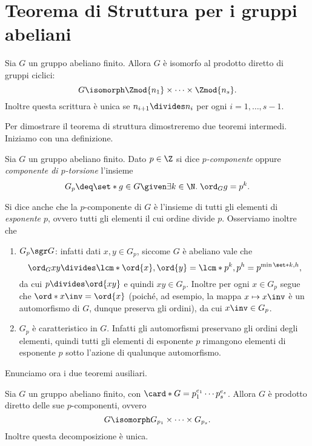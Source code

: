 \section{Teorema di Struttura per i gruppi abeliani}

\begin{theorem}
    \label{th:abelian_structure}
    Sia $G$ un gruppo abeliano finito. Allora $G$ è isomorfo al prodotto diretto di gruppi ciclici:
    \begin{equation}
        G \isomorph \Zmod{n_1} \times \cdots \times \Zmod{n_s}.
    \end{equation} Inoltre questa scrittura è unica se $n_{i+1} \divides n_i$ per ogni $i = 1, \dots, s-1$.
\end{theorem}

Per dimostrare il teorema di struttura dimostreremo due teoremi intermedi. Iniziamo con una definizione.

\begin{definition}
     Sia $G$ un gruppo abeliano finito. Dato $p \in \Z$ si dice \emph{$p$-componente} oppure \emph{componente di $p$-torsione} l'insieme \[
        G_p \deq \set*{g \in G \given \exists k \in \N.\; \ord_{G}{g} = p^k}.
    \]
\end{definition}

Si dice anche che la $p$-componente di $G$ è l'insieme di tutti gli elementi di \emph{esponente $p$}, ovvero tutti gli elementi il cui ordine divide $p$.
Osserviamo inoltre che \begin{enumerate}[label={(\arabic*)}]
    \item $G_p \sgr G$: infatti dati $x, y \in G_p$, siccome $G$ è abeliano vale che \[
        \ord_{G}{xy} \divides \lcm*{\ord{x}, \ord{y}} = \lcm*{p^k, p^h} = p^{\min\set*{k, h}},
    \] da cui $p \divides \ord{xy}$ e quindi $xy \in G_p$. Inoltre per ogni $x \in G_p$ segue che $\ord*{x\inv} = \ord{x}$ (poiché, ad esempio, la mappa $x \mapsto x\inv$ è un automorfismo di $G$, dunque preserva gli ordini), da cui $x\inv \in G_p$.
    \item $G_p$ è caratteristico in $G$. Infatti gli automorfismi preservano gli ordini degli elementi, quindi tutti gli elementi di esponente $p$ rimangono elementi di esponente $p$ sotto l'azione di qualunque automorfismo.
\end{enumerate}

Enunciamo ora i due teoremi ausiliari.
\begin{theorem}
     \label{th:abelian_struct_1} Sia $G$ un gruppo abeliano finito, con $\card*{G} = p_1^{e_1}\cdots p_s^{e_s}$. Allora $G$ è prodotto diretto delle sue $p$-componenti, ovvero \[
        G \isomorph G_{p_1} \times \cdots \times G_{p_s}.    
    \] Inoltre questa decomposizione è unica.
\end{theorem}

